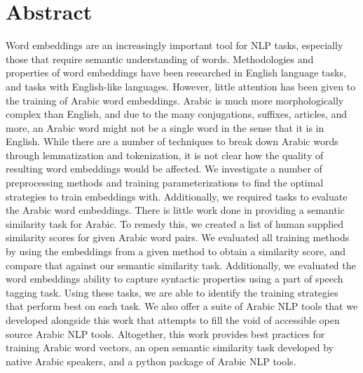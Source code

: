 \section*{Abstract}

Word embeddings are an increasingly important tool for NLP tasks, especially those that require semantic understanding of words.
Methodologies and properties of word embeddings have been researched in English language tasks, and tasks with English-like languages.
However, little attention has been given to the training of Arabic word embeddings.
Arabic is much more morphologically complex than English, and due to the many conjugations, suffixes, articles, and more, an Arabic word might not be a single word in the sense that it is in English.
While there are a number of techniques to break down Arabic words through lemmatization and tokenization, it is not clear how the quality of resulting word embeddings would be affected.
We investigate a number of preprocessing methods and training parameterizations to find the optimal strategies to train embeddings with.
Additionally, we required tasks to evaluate the Arabic word embeddings.
There is little work done in providing a semantic similarity task for Arabic.
To remedy this, we created a list of human supplied similarity scores for given Arabic word pairs.
We evaluated all training methods by using the embeddings from a given method to obtain a similarity score, and compare that against our semantic similarity task.
Additionally, we evaluated the word embeddings ability to capture syntactic properties using a part of speech tagging task.
Using these tasks, we are able to identify the training strategies that perform best on each task.
We also offer a suite of Arabic NLP tools that we developed alongside this work that attempts to fill the void of accessible open source Arabic NLP tools.
Altogether, this work provides best practices for training Arabic word vectors, an open semantic similarity task developed by native Arabic speakers, and a python package of Arabic NLP tools.